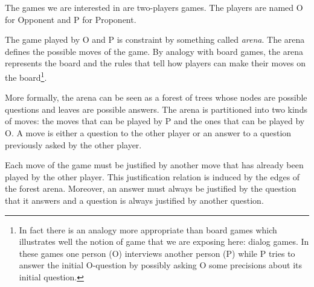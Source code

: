The games we are interested in are two-players games. The players are named O for Opponent and P for Proponent.

The game played by O and P is constraint by something called \emph{arena}. The arena defines the possible moves of the game.
By analogy with board games, the arena represents the board and the rules that tell how players can make their moves
on the board\footnote{In fact there is an analogy more appropriate than board games which illustrates
well the notion of game that we are exposing here: dialog games.
In these games one person (O) interviews another person (P) while
P tries to answer the initial O-question by possibly asking O some precisions about its initial question.}.


More formally, the arena can be seen as a forest of trees whose nodes are possible questions and leaves are possible answers.
The arena is partitioned into two kinds of moves: the moves that can be played by P and the ones that can be played by O.
A move is either a question to the other player or an answer to a question previously asked by the other player.

Each move of the game must be justified by another move that has already been played by the other player. This justification relation
is induced by the edges of the forest arena. Moreover, an answer must always be justified by the question that it answers and a question
is always justified by another question.

